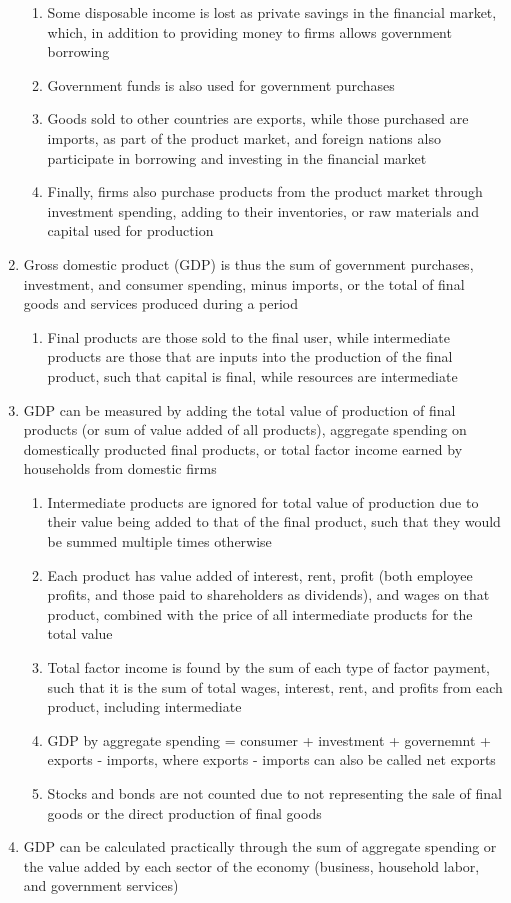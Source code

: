 \documentclass[11 pt, twoside]{article}
\begin{document}
\begin{enumerate}
\begin{enumerate}
\item Some disposable income is lost as private savings in the financial market, which, in addition to providing money to firms allows government borrowing
\item Government funds is also used for government purchases
\item Goods sold to other countries are exports, while those purchased are imports, as part of the product market, and foreign nations also participate in borrowing and investing in the financial market
\item Finally, firms also purchase products from the product market through investment spending, adding to their inventories, or raw materials and capital used for production
\end{enumerate}
\item Gross domestic product (GDP) is thus the sum of government purchases, investment, and consumer spending, minus imports, or the total of final goods and services produced during a period
\begin{enumerate}
\item Final products are those sold to the final user, while intermediate products are those that are inputs into the production of the final product, such that capital is final, while resources are intermediate
\end{enumerate}
\item GDP can be measured by adding the total value of production of final products (or sum of value added of all products), aggregate spending on domestically producted final products, or total factor income earned by households from domestic firms
\begin{enumerate}
\item Intermediate products are ignored for total value of production due to their value being added to that of the final product, such that they would be summed multiple times otherwise
\item Each product has value added of interest, rent, profit (both employee profits, and those paid to shareholders as dividends), and wages on that product, combined with the price of all intermediate products for the total value
\item Total factor income is found by the sum of each type of factor payment, such that it is the sum of total wages, interest, rent, and profits from each product, including intermediate
\item GDP by aggregate spending = consumer + investment + governemnt + exports - imports, where exports - imports can also be called net exports
\item Stocks and bonds are not counted due to not representing the sale of final goods or the direct production of final goods
\end{enumerate}
\item GDP can be calculated practically through the sum of aggregate spending or the value added by each sector of the economy (business, household labor, and government services)
\end{enumerate}
\end{document}
